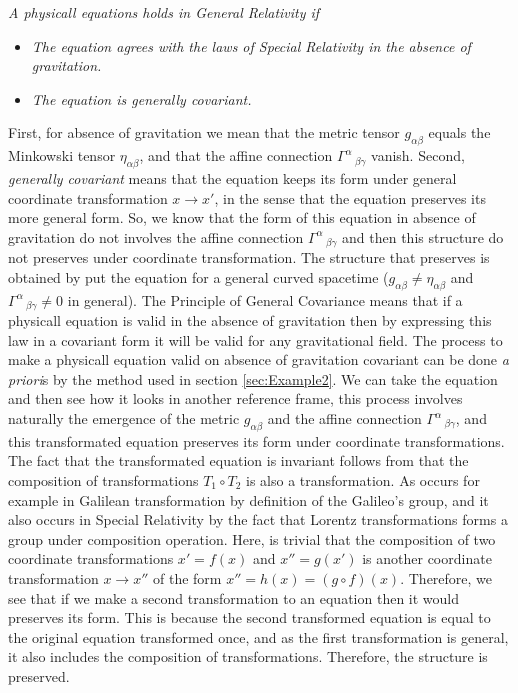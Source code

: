 \documentclass[10pt, letterpaper, oneside]{book}
\theoremstyle{theorem} %
\theoremstyle{theorem} %
\theoremstyle{definition}
\theoremstyle{remark}
\theoremstyle{definition}
\theoremstyle{definition}
\theoremstyle{theorem}
\begin{document}
\textit{A physicall equations holds in General Relativity if}
\begin{itemize}
	\item[\textit{1.}] \textit{The equation agrees with the laws of Special Relativity in the absence of gravitation.} 
	\item[\textit{2.}] \textit{The equation is generally covariant.}
\end{itemize}
First, for absence of gravitation we mean that the metric tensor $g_{\alpha\beta}$ equals the Minkowski tensor $\eta_{\alpha\beta}$, and that the affine connection $\Gamma^\alpha\,_{\beta\gamma}$ vanish. Second, \textit{generally covariant} means that the equation keeps its form under general coordinate transformation $x\to x'$, in the sense that the equation preserves its more general form. So, we know that the form of this equation in absence of gravitation do not involves the affine connection $\Gamma^\alpha\,_{\beta\gamma}$ and then this structure do not preserves under coordinate transformation. The structure that preserves is obtained by put the equation for a general curved spacetime ($g_{\alpha\beta}\neq \eta_{\alpha\beta}$ and $\Gamma^\alpha\,_{\beta\gamma} \neq 0$ in general). The Principle of General Covariance means that if a physicall equation is valid in the absence of gravitation then by expressing this law in a covariant form it will be valid for any gravitational field. The process to make a physicall equation valid on absence of gravitation covariant can be done \textit{a priori}s by the method used in section \ref{sec:Example2}. We can take the equation and then see how it looks in another reference frame, this process involves naturally the emergence of the metric $g_{\alpha\beta}$ and the affine connection $\Gamma^\alpha\,_{\beta\gamma}$, and this transformated equation preserves its form under coordinate transformations. The fact that the transformated equation is invariant follows from that the composition of transformations $T_1 \circ T_2$ is also a transformation. As occurs for example in Galilean transformation by definition of the Galileo's group, and it also occurs in Special Relativity by the fact that Lorentz transformations forms a group under composition operation. Here, is trivial that the composition of two coordinate transformations $x'=f(x)$ and $x''=g(x')$ is another coordinate transformation $x\to x''$ of the form $x'' = h(x)=(g\circ f)(x)$. Therefore, we see that if we make a second transformation to an equation then it would preserves its form. This is because the second transformed equation is equal to the original equation transformed once, and as the first transformation is general, it also includes the composition of transformations. Therefore, the structure is preserved.

\nocite{*}



\end{document}
